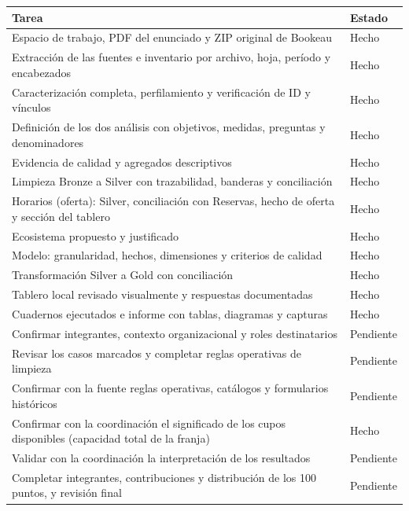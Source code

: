 \documentclass[11pt,letterpaper]{article}
\begin{document}
\begingroup\small\setlength{\tabcolsep}{4pt}\renewcommand{\arraystretch}{1.15}
\begin{longtable}{>{\raggedright\arraybackslash}p{}>{\raggedright\arraybackslash}p{}}
\toprule
\textbf{Tarea} & \textbf{Estado} \\
\midrule
\endhead
Espacio de trabajo, PDF del enunciado y ZIP original de Bookeau & Hecho \\
Extracción de las fuentes e inventario por archivo, hoja, período y encabezados & Hecho \\
Caracterización completa, perfilamiento y verificación de ID y vínculos & Hecho \\
Definición de los dos análisis con objetivos, medidas, preguntas y denominadores & Hecho \\
Evidencia de calidad y agregados descriptivos & Hecho \\
Limpieza Bronze a Silver con trazabilidad, banderas y conciliación & Hecho \\
Horarios (oferta): Silver, conciliación con Reservas, hecho de oferta y sección del tablero & Hecho \\
Ecosistema propuesto y justificado & Hecho \\
Modelo: granularidad, hechos, dimensiones y criterios de calidad & Hecho \\
Transformación Silver a Gold con conciliación & Hecho \\
Tablero local revisado visualmente y respuestas documentadas & Hecho \\
Cuadernos ejecutados e informe con tablas, diagramas y capturas & Hecho \\
Confirmar integrantes, contexto organizacional y roles destinatarios & Pendiente \\
Revisar los casos marcados y completar reglas operativas de limpieza & Pendiente \\
Confirmar con la fuente reglas operativas, catálogos y formularios históricos & Pendiente \\
Confirmar con la coordinación el significado de los cupos disponibles (capacidad total de la franja) & Hecho \\
Validar con la coordinación la interpretación de los resultados & Pendiente \\
Completar integrantes, contribuciones y distribución de los 100 puntos, y revisión final & Pendiente \\
\bottomrule
\end{longtable}
\endgroup
\end{document}
